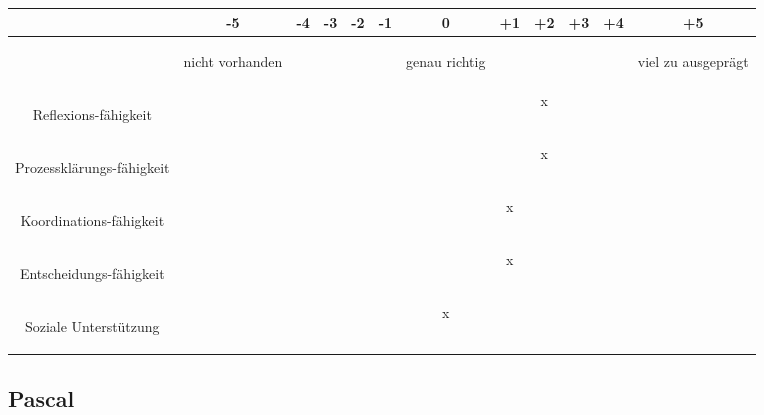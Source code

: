 \begin{tabular}{C{\fabstand}|C{\abstand}|C{\abstand}|C{\abstand}|C{\abstand}|C{\abstand}|C{\abstand}|C{\abstand}|C{\abstand}|C{\abstand}|C{\abstand}|C{\abstand}|}
\hline
& -5 & -4 & -3 & -2 & -1 & 0 & +1 & +2 & +3 & +4 & +5\\
\hline
&\begin{tiny}nicht vorhanden \end{tiny}& & & & & \begin{tiny}genau richtig \end{tiny}& & & & & \begin{tiny}viel zu ausgeprägt\end{tiny}\\
\hline
\begin{tiny} Reflexions-fähigkeit \end{tiny} & & & & & & & & x & & & \\
\hline
\begin{tiny} Prozessklärungs-fähigkeit \end{tiny}& & & & & & & & x & & & \\
\hline
\begin{tiny} Koordinations-fähigkeit \end{tiny}& & & & & & & x & & & & \\
\hline
\begin{tiny} Entscheidungs-fähigkeit \end{tiny}& & & & & & & x & & & & \\
\hline
\begin{tiny} Soziale Unterstützung \end{tiny}& & & & & & x & & & & & \\
\hline
\end{tabular}

\subsection*{Pascal}

